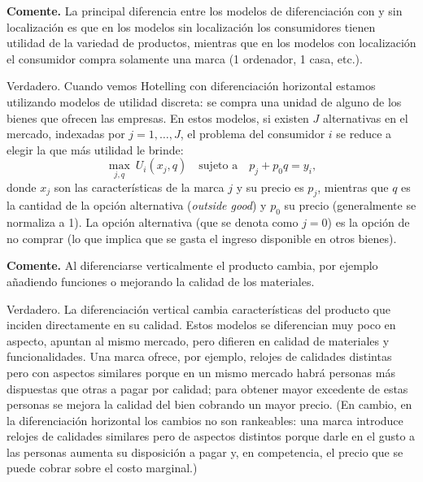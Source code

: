 \question \textbf{Comente.} La principal diferencia entre los modelos de diferenciación con y sin localización es que en los modelos sin localización los consumidores tienen utilidad de la variedad de productos, mientras que en los modelos con localización el consumidor compra solamente una marca (1 ordenador, 1 casa, etc.).
\begin{solution}
Verdadero. Cuando vemos Hotelling con diferenciación horizontal estamos utilizando modelos de utilidad discreta: se compra una unidad de alguno de los bienes que ofrecen las empresas. En estos modelos, si existen $J$ alternativas en el mercado, indexadas por $j = 1,\dots,J$, el problema del consumidor $i$ se reduce a elegir la que más utilidad le brinde:
\[
  \max_{j,q}\ U_i(x_j, q) \quad \text{sujeto a} \quad p_j + p_0 q = y_i ,
\]
donde $x_j$ son las características de la marca $j$ y su precio es $p_j$, mientras que $q$ es la cantidad de la opción alternativa (\emph{outside good}) y $p_0$ su precio (generalmente se normaliza a 1). La opción alternativa (que se denota como $j = 0$) es la opción de no comprar (lo que implica que se gasta el ingreso disponible en otros bienes).

\end{solution}

\question \textbf{Comente.} Al diferenciarse verticalmente el producto cambia, por ejemplo añadiendo funciones o mejorando la calidad de los materiales.
\begin{solution}
Verdadero. La diferenciación vertical cambia características del producto que inciden directamente en su calidad. Estos modelos se diferencian muy poco en aspecto, apuntan al mismo mercado, pero difieren en calidad de materiales y funcionalidades. Una marca ofrece, por ejemplo, relojes de calidades distintas pero con aspectos similares porque en un mismo mercado habrá personas más dispuestas que otras a pagar por calidad; para obtener mayor excedente de estas personas se mejora la calidad del bien cobrando un mayor precio. (En cambio, en la diferenciación horizontal los cambios no son rankeables: una marca introduce relojes de calidades similares pero de aspectos distintos porque darle en el gusto a las personas aumenta su disposición a pagar y, en competencia, el precio que se puede cobrar sobre el costo marginal.)

\end{solution}

